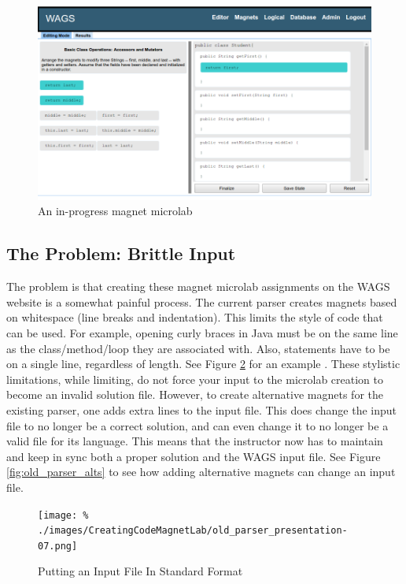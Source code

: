 \documentclass[letter,10pt,final]{article}
\begin{document}
\begin{figure}[h!]
 \centering
 \includegraphics{./images/magnet-lab.png}
 \caption{An in-progress magnet microlab}
 \label{fig:magnet-lab}
\end{figure}

\subsection{The Problem: Brittle Input}

The problem is that creating these magnet microlab assignments on the 
WAGS website is a somewhat painful process. The current parser creates 
magnets based on whitespace (line breaks and indentation). This limits 
the style of code that can be used. For example, opening curly braces 
in Java must be on the same line as the class/method/loop they are 
associated with. Also, statements have to be on a single line, 
regardless of length. See Figure \ref{fig:old_parser_style} for an 
example \cite{icer_pres_4_creating_lab}. These stylistic limitations, 
while limiting, do not force your input to the microlab creation to 
become an invalid solution file. However, to create alternative magnets 
for the existing parser, one adds extra lines to the input file. This 
does change the input file to no longer be a correct solution, and can 
even change it to no longer be a valid file for its language. This 
means that the instructor now has to maintain and keep in sync both a 
proper solution and the WAGS input file. See Figure 
\ref{fig:old_parser_alts} to see how adding alternative magnets 
can change an input file.

\begin{figure}[h!]
 \centering
 
  \texttt{[image: \%    
./images/CreatingCodeMagnetLab/old\_parser\_presentation-07.png]}
 \caption{Putting an Input File In Standard Format %
\cite{icer_pres_4_creating_lab}}
 \label{fig:old_parser_style}
\end{figure}
\end{document}
